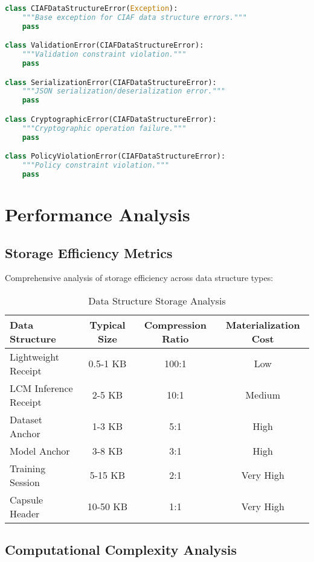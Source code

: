 \documentclass[12pt,a4paper]{article}
\begin{document}
\begin{lstlisting}[language=Python, caption=Error Classification System]
class CIAFDataStructureError(Exception):
    """Base exception for CIAF data structure errors."""
    pass

class ValidationError(CIAFDataStructureError):
    """Validation constraint violation."""
    pass

class SerializationError(CIAFDataStructureError):
    """JSON serialization/deserialization error."""
    pass

class CryptographicError(CIAFDataStructureError):
    """Cryptographic operation failure."""
    pass

class PolicyViolationError(CIAFDataStructureError):
    """Policy constraint violation."""
    pass
\end{lstlisting}

\section{Performance Analysis}

\subsection{Storage Efficiency Metrics}

Comprehensive analysis of storage efficiency across data structure types:

\begin{table}[H]
\centering
\caption{Data Structure Storage Analysis}
\begin{tabular}{@{}lccc@{}}
\toprule
\textbf{Data Structure} & \textbf{Typical Size} & \textbf{Compression Ratio} & \textbf{Materialization Cost} \\
\midrule
Lightweight Receipt & 0.5-1 KB & 100:1 & Low \\
LCM Inference Receipt & 2-5 KB & 10:1 & Medium \\
Dataset Anchor & 1-3 KB & 5:1 & High \\
Model Anchor & 3-8 KB & 3:1 & High \\
Training Session & 5-15 KB & 2:1 & Very High \\
Capsule Header & 10-50 KB & 1:1 & Very High \\
\bottomrule
\end{tabular}
\label{tab:storage}
\end{table}

\subsection{Computational Complexity Analysis}
\end{document}
